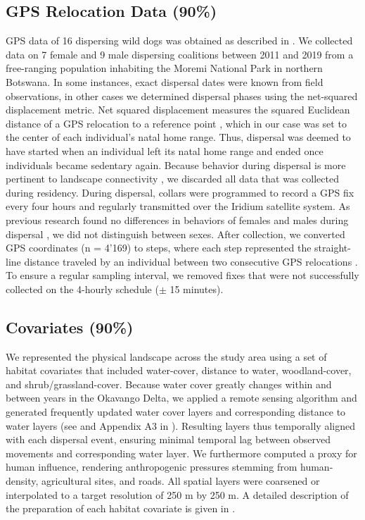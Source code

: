 \documentclass[abstract=on,10pt,a4paper,bibliography=totocnumbered]{article}
\begin{document}
\subsection{GPS Relocation Data (90\%)}
GPS data of 16 dispersing wild dogs was obtained as described in
\citep{Cozzi.2020, Hofmann.2021}. We collected data on 7 female and 9 male
dispersing coalitions between 2011 and 2019 from a free-ranging population
inhabiting the Moremi National Park in northern Botswana. In some instances,
exact dispersal dates were known from field observations, in other cases we
determined dispersal phases using the net-squared displacement metric. Net
squared displacement measures the squared Euclidean distance of a GPS relocation
to a reference point \citep{Borger.2012}, which in our case was set to the
center of each individual's natal home range. Thus, dispersal was deemed to have
started when an individual left its natal home range and ended once individuals
became sedentary again. Because behavior during dispersal is more pertinent to
landscape connectivity \citep{Elliot.2014, Abrahms.2017}, we discarded all data
that was collected during residency. During dispersal, collars were programmed
to record a GPS fix every four hours and regularly transmitted over the Iridium
satellite system. As previous research found no differences in behaviors of
females and males during dispersal \citep{Woodroffe.2019, Cozzi.2020}, we did
not distinguish between sexes. After collection, we converted GPS coordinates (n
= 4'169) to steps, where each step represented the straight-line distance
traveled by an individual between two consecutive GPS relocations
\citep{Turchin.1998}. To ensure a regular sampling interval, we removed fixes
that were not successfully collected on the 4-hourly schedule (\( \pm \) 15
minutes).

\subsection{Covariates (90\%)}
We represented the physical landscape across the study area using a set of
habitat covariates that included water-cover, distance to water, woodland-cover,
and shrub/grassland-cover. Because water cover greatly changes within and
between years in the Okavango Delta, we applied a remote sensing algorithm and
generated frequently updated water cover layers and corresponding distance to
water layers (see \citealp{Wolski.2017} and Appendix A3 in
\citealp{Hofmann.2021}). Resulting layers thus temporally aligned with each
dispersal event, ensuring minimal temporal lag between observed movements and
corresponding water layer. We furthermore computed a proxy for human influence,
rendering anthropogenic pressures stemming from human-density, agricultural
sites, and roads. All spatial layers were coarsened or interpolated to a target
resolution of 250 m by 250 m. A detailed description of the preparation of each
habitat covariate is given in \cite{Hofmann.2021}.
\end{document}
